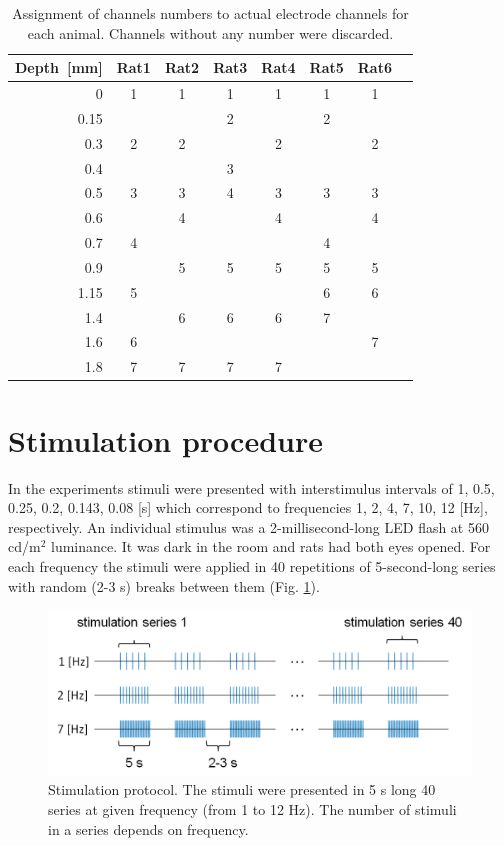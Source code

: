 \documentclass{pracalicmgr}
\begin{document}
   \begin{table}[H]
   	\caption{Assignment of channels numbers to actual electrode channels for each animal. Channels without any number were discarded.}
   	\begin{center}
   		\begin{tabularx}{0.9\textwidth}{R C C C C C C C}
   			\toprule
   			\textbf{Depth~[mm]} & \textbf{Rat1} & \textbf{Rat2} & \textbf{Rat3} & \textbf{Rat4} & \textbf{Rat5} & \textbf{Rat6} \\
   			 & 1 & 1 & 1 & 1 & 1 & 1 \\
   			0.15 &  &  & 2 & & 2&  \\
   			0.3 & 2 & 2 &  & 2 & & 2 \\
   			0.4 &  &  & 3 &  &  &  \\
   			0.5 & 3 & 3 &4  & 3 & 3 & 3 \\
   			0.6 & & 4 &  & 4 & & 4 \\
   			0.7 & 4 &  &  &  & 4 &  \\
   			0.9 & & 5 & 5 & 5 & 5& 5 \\
   			1.15 & 5 &  &  &  & 6 & 6 \\
   			1.4 & & 6 & 6 & 6 & 7 &  \\
   			1.6 & 6 &  &  &  & & 7 \\
   			1.8 & 7 & 7 & 7 & 7 & &  \\
   			\bottomrule
   		\end{tabularx}
   	\end{center}
   	\label{tab:chosen_chan}
   \end{table}
   \newpage
   \section{Stimulation procedure}
   In the experiments stimuli were presented with interstimulus intervals of  1, 0.5, 0.25, 0.2, 0.143, 0.08 [s] which correspond to frequencies 1, 2, 4, 7, 10, 12 [Hz], respectively. An individual stimulus was a 2-millisecond-long LED flash at 560 cd/m$^2$ luminance. It was dark in the room and rats had both eyes opened. For each frequency the stimuli were applied in 40 repetitions of 5-second-long series with random (2-3 s) breaks between them (Fig. \ref{rys:stimuli}).
   \begin{figure}[htbp]
   	\begin{center}
   		\includegraphics[scale=0.5]{paradigms.png}
   	\end{center}
   	\caption{ Stimulation protocol. The stimuli were presented in 5 s long 40 series at given frequency (from 1 to 12 Hz). The number of stimuli in a series depends on frequency.}
   	\label{rys:stimuli}
   \end{figure} 
   
\end{document}
